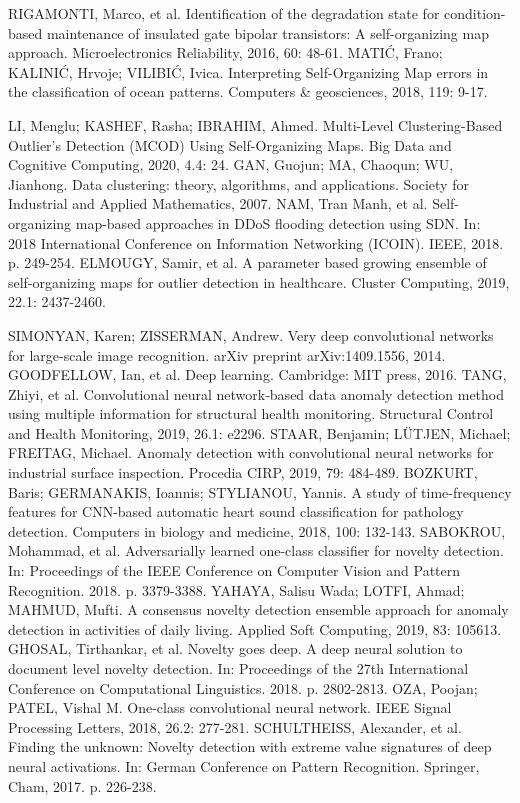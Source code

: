 \documentclass[11pt,twoside,openright]{report}
\begin{document}
\begin{thebibliography}{L}
RIGAMONTI, Marco, et al. Identification of the degradation state for condition-based maintenance of insulated gate bipolar transistors: A self-organizing map approach. Microelectronics Reliability, 2016, 60: 48-61.
MATIĆ, Frano; KALINIĆ, Hrvoje; VILIBIĆ, Ivica. Interpreting Self-Organizing Map errors in the classification of ocean patterns. Computers \& geosciences, 2018, 119: 9-17.

LI, Menglu; KASHEF, Rasha; IBRAHIM, Ahmed. Multi-Level Clustering-Based Outlier’s Detection (MCOD) Using Self-Organizing Maps. Big Data and Cognitive Computing, 2020, 4.4: 24.
GAN, Guojun; MA, Chaoqun; WU, Jianhong. Data clustering: theory, algorithms, and applications. Society for Industrial and Applied Mathematics, 2007.
NAM, Tran Manh, et al. Self-organizing map-based approaches in DDoS flooding detection using SDN. In: 2018 International Conference on Information Networking (ICOIN). IEEE, 2018. p. 249-254.
ELMOUGY, Samir, et al. A parameter based growing ensemble of self-organizing maps for outlier detection in healthcare. Cluster Computing, 2019, 22.1: 2437-2460.



SIMONYAN, Karen; ZISSERMAN, Andrew. Very deep convolutional networks for large-scale image recognition. arXiv preprint arXiv:1409.1556, 2014.
GOODFELLOW, Ian, et al. Deep learning. Cambridge: MIT press, 2016.
TANG, Zhiyi, et al. Convolutional neural network‐based data anomaly detection method using multiple information for structural health monitoring. Structural Control and Health Monitoring, 2019, 26.1: e2296.
STAAR, Benjamin; LÜTJEN, Michael; FREITAG, Michael. Anomaly detection with convolutional neural networks for industrial surface inspection. Procedia CIRP, 2019, 79: 484-489.
BOZKURT, Baris; GERMANAKIS, Ioannis; STYLIANOU, Yannis. A study of time-frequency features for CNN-based automatic heart sound classification for pathology detection. Computers in biology and medicine, 2018, 100: 132-143.
SABOKROU, Mohammad, et al. Adversarially learned one-class classifier for novelty detection. In: Proceedings of the IEEE Conference on Computer Vision and Pattern Recognition. 2018. p. 3379-3388.
YAHAYA, Salisu Wada; LOTFI, Ahmad; MAHMUD, Mufti. A consensus novelty detection ensemble approach for anomaly detection in activities of daily living. Applied Soft Computing, 2019, 83: 105613.
GHOSAL, Tirthankar, et al. Novelty goes deep. A deep neural solution to document level novelty detection. In: Proceedings of the 27th International Conference on Computational Linguistics. 2018. p. 2802-2813.
OZA, Poojan; PATEL, Vishal M. One-class convolutional neural network. IEEE Signal Processing Letters, 2018, 26.2: 277-281.
SCHULTHEISS, Alexander, et al. Finding the unknown: Novelty detection with extreme value signatures of deep neural activations. In: German Conference on Pattern Recognition. Springer, Cham, 2017. p. 226-238.


\end{thebibliography}
\end{document}
